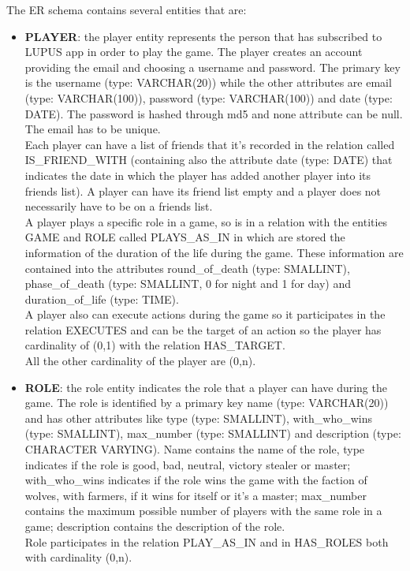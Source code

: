 The ER schema contains several entities that are:
\begin{itemize}
    \item \textbf{PLAYER}: the player entity represents the person that has subscribed to LUPUS app in order to play the game. The player creates an account providing the email and choosing a username and password. The primary key is the username (type: VARCHAR(20)) while the other attributes are email (type: VARCHAR(100)), password (type: VARCHAR(100)) and date (type: DATE). The password is hashed through md5 and none attribute can be null. The email has to be unique.\\
    Each player can have a list of friends that it’s recorded in the relation called IS\_FRIEND\_WITH (containing also the attribute date (type: DATE) that indicates the date in which the player has added another player into its friends list). A player can have its friend list empty and a player does not necessarily have to be on a friends list. \\
    A player plays a specific role in a game, so is in a relation with the entities GAME and ROLE called PLAYS\_AS\_IN in which are stored the information of the duration of the life during the game. These information are contained into the attributes round\_of\_death (type: SMALLINT), phase\_of\_death (type: SMALLINT, 0 for night and 1 for day) and duration\_of\_life (type: TIME).\\
    A player also can execute actions during the game so it participates in the relation EXECUTES and can be the target of an action so the player has cardinality of (0,1) with the relation HAS\_TARGET. \\
    All the other cardinality of the player are (0,n).
    \item \textbf{ROLE}: the role entity indicates the role that a player can have during the game. The role is identified by a primary key name (type: VARCHAR(20)) and has other attributes like type (type: SMALLINT), with\_who\_wins (type: SMALLINT), max\_number (type: SMALLINT) and description (type: CHARACTER VARYING). Name contains the name of the role, type indicates if the role is good, bad, neutral, victory stealer or master; with\_who\_wins indicates if the role wins the game with the faction of wolves, with farmers, if it wins for itself or it's a master; max\_number contains the maximum possible number of players with the same role in a game; description contains the description of the role.\\
    Role participates in the relation PLAY\_AS\_IN and in HAS\_ROLES both with cardinality (0,n).\\

\end{itemize}
